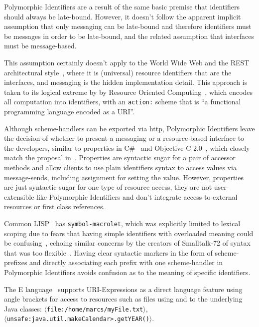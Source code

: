\documentclass[preprint]{sigplanconf}
\begin{document}
Polymorphic Identifiers are a result of the same basic premise that identifiers should always be late-bound.  However,
it doesn't follow the apparent implicit assumption that only messaging can be late-bound and therefore identifiers must
be messages in order to be late-bound, and the related assumption that interfaces must be message-based.

This assumption certainly doesn't apply to the World Wide Web and the REST architectural style~\cite{fielding-rest}, where
it is (universal) resource identifiers that are the interfaces, and messaging is the hidden implementation detail.  This 
approach is taken to its logical extreme by  by Resource Oriented Computing~\cite{roc},
which encodes all computation into identifiers, with an {\tt action:} scheme that is ``a functional programming language encoded as a URI''.

Although scheme-handlers can be exported via http, Polymorphic Identifiers leave the decision of whether to present a messaging
or a resource-based interface to the developers,
similar to properties in C\#~\cite{Archer:2001:IC:516715} and Objective-C 2.0~\cite{Kochan:2009:PO:1538451}, which closely match the proposal in~\cite{Spinellis:2002:MPC:510857.510868}.  Properties are syntactic sugar for a pair of accessor methods and allow clients to use 
 plain identifiers syntax to access values via message-sends, including assignment for setting the value.   However, properties
 are just syntactic sugar for one type of resource access, they are not user-extensible like Polymorphic Identifiers 
 and don't integrate access to external resources or first class references.

Common LISP~\cite{Steele:1990:CLL:95411} has {\tt symbol-macrolet}, which was explicitly limited to lexical scoping due to fears 
that having simple identifiers with overloaded meaning could be confusing~\cite{gabriel-lisp-identifiers}, echoing similar concerns by the creators
of Smalltalk-72 of syntax that was too flexible~\cite{Kay:1996:EHS:234286.1057828}.  Having clear syntactic markers in the form of scheme-prefixes
and directly associating each prefix with one scheme-handler in Polymorphic Identifiers avoids confusion as to the meaning of specific identifiers.

The E language~\cite{MillerRobustComposition}  supports URI-Expressions as a direct language feature using angle brackets for access to 
resources such as files using and to the underlying Java classes:   {\tt $\langle$file:/home/marcs/myFile.txt$\rangle$},  \\ {\tt $\langle$unsafe:java.util.makeCalendar>.getYEAR()$\rangle$}.
\end{document}
